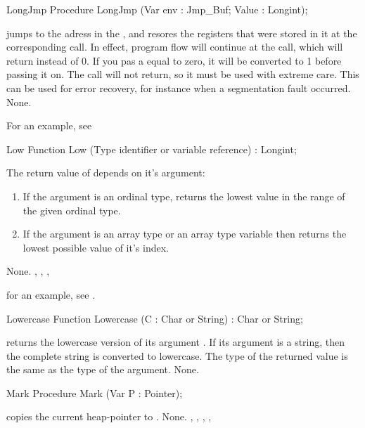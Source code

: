 \documentclass{report}
\begin{document}
\begin{procedure}{LongJmp}
\Declaration
Procedure LongJmp (Var env : Jmp\_Buf; Value : Longint);

\Description

 jumps to the adress in the  ,
and resores the registers that were stored in it at the corresponding
 call.
In effect, program flow will continue at the  call, which will
return  instead of 0. If you pas a  equal to zero, it will be
converted to 1 before passing it on. The call will not return, so it must be
used with extreme care.
This can be used for error recovery, for instance when a segmentation fault
occurred.
\Errors
None.
\SeeAlso
{}
\end{procedure}
For an example, see 
\begin{function}{Low}
\Declaration
Function Low (Type identifier or variable reference) : Longint;

\Description
 The return value of  depends on it's argument:
\begin{enumerate}
\item If the argument is an ordinal type,  returns the lowest 
value in the range of the given ordinal type.
\item If the argument is an array type or an array type variable then
 returns the lowest possible value of it's index.
\end{enumerate}

\Errors
None.
\SeeAlso
{}, , , 
\end{function}
for an example, see .
\begin{function}{Lowercase}
\Declaration
Function Lowercase (C : Char or String) : Char or String;

\Description
{} returns the lowercase version of its argument .
If its argument is a string, then the complete string is converted to
lowercase. The type of the returned value is the same as the type of the
argument.
\Errors
None.
\SeeAlso
{}
\end{function}


\begin{procedure}{Mark}
\Declaration
Procedure Mark (Var P : Pointer);

\Description
{} copies the current heap-pointer to .
\Errors
None.
\SeeAlso
{}, , , , 
\end{procedure}
\end{document}
